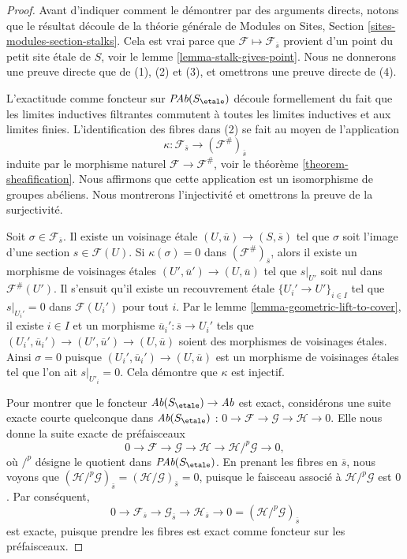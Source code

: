 \begin{proof}
Avant d'indiquer comment le d\'emontrer par des arguments directs,
notons que le r\'esultat d\'ecoule de la th\'eorie g\'en\'erale de
Modules on Sites, Section \ref{sites-modules-section-stalks}.
Cela est vrai parce que $\mathcal{F} \mapsto \mathcal{F}_{\overline{s}}$
provient d'un point du petit site \'etale de $S$, voir le
lemme \ref{lemma-stalk-gives-point}.
Nous ne donnerons une preuve directe que de (1), (2) et (3), et omettrons
une preuve directe de (4).

\medskip\noindent
L'exactitude comme foncteur sur $\textit{PAb}(S_\etale)$ d\'ecoule formellement du
fait que les limites inductives filtrantes commutent \`a toutes les limites inductives et aux
limites finies. L'identification des fibres dans (2) se fait au moyen de l'application
$$
\kappa :
\mathcal{F}_{\overline{s}}
\longrightarrow
(\mathcal{F}^\#)_{\overline{s}}
$$
induite par le morphisme naturel $\mathcal{F}\to \mathcal{F}^\#$, voir le
th\'eor\`eme \ref{theorem-sheafification}.
Nous affirmons que cette application est un isomorphisme de groupes ab\'eliens. Nous montrerons
l'injectivit\'e et omettrons la preuve de la surjectivit\'e.

\medskip\noindent
Soit $\sigma\in \mathcal{F}_{\overline{s}}$.
Il existe un voisinage \'etale
$(U, \overline{u})\to (S, \overline{s})$ tel que $\sigma$ soit l'image d'une
section $s \in \mathcal{F}(U)$. Si $\kappa(\sigma) = 0$ dans
$(\mathcal{F}^\#)_{\overline{s}}$, alors il existe un morphisme de voisinages \'etales
$(U', \overline{u}')\to (U, \overline{u})$ tel que
$s|_{U'}$ soit nul dans $\mathcal{F}^\#(U')$. Il s'ensuit qu'il
existe un recouvrement \'etale
$\{U_i'\to U'\}_{i\in I}$ tel que $s|_{U_i'}=0$ dans
$\mathcal{F}(U_i')$ pour tout $i$. Par le lemme \ref{lemma-geometric-lift-to-cover},
il existe $i \in I$ et un morphisme
$\overline{u}_i': \overline{s} \to U_i'$ tels que
$(U_i', \overline{u}_i') \to (U', \overline{u}')\to (U, \overline{u})$
soient des morphismes de voisinages \'etales. Ainsi $\sigma = 0$
puisque $(U_i', \overline{u}_i') \to (U, \overline{u})$
est un morphisme de voisinages \'etales tel que
l'on ait $s|_{U'_i}=0$. Cela d\'emontre que $\kappa$ est injectif.

\medskip\noindent
Pour montrer que le foncteur $\textit{Ab}(S_\etale) \to \textit{Ab}$ est
exact, consid\'erons une suite exacte courte quelconque dans $\textit{Ab}(S_\etale)$ :
$
0\to \mathcal{F}\to \mathcal{G}\to \mathcal H \to 0.
$
Elle nous donne la suite exacte de pr\'efaisceaux
$$
0 \to \mathcal{F} \to \mathcal{G} \to \mathcal H \to
\mathcal H/^p\mathcal{G} \to 0,
$$
o\`u $/^p$ d\'esigne le quotient dans $\textit{PAb}(S_\etale)$.
En prenant les fibres en
$\overline{s}$, nous voyons que $(\mathcal H /^p\mathcal{G})_{\bar{s}} =
(\mathcal H /\mathcal{G})_{\bar{s}} = 0$, puisque le faisceau associ\'e \`a
$\mathcal H/^p\mathcal{G}$ est $0$.
Par cons\'equent,
$$
0\to \mathcal{F}_{\overline{s}} \to \mathcal{G}_{\overline{s}} \to
\mathcal{H}_{\overline{s}} \to 0 = (\mathcal H/^p\mathcal{G})_{\overline{s}}
$$
est exacte, puisque prendre les fibres est exact comme foncteur sur les pr\'efaisceaux.
\end{proof}

